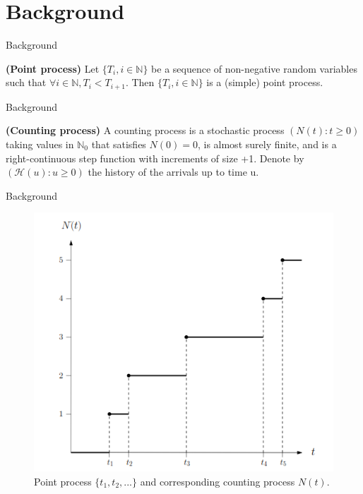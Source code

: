 \documentclass[11pt]{beamer}
\theoremstyle{example}
\begin{document}
\section{Background}
\begin{frame}{Background}
\begin{definition}
	\textbf{(Point process)} Let $\{T_i, i \in \mathbb{N} \}$ be a sequence of non-negative random variables such that $\forall i \in \mathbb{N}, T_i<T_{i+1}$. Then $\{T_i, i \in \mathbb{N} \}$ is a (simple) point process.
\end{definition}
\end{frame}
\begin{frame}{Background}
	\begin{definition}
		\textbf{(Counting process)} A counting process is a stochastic process $(N(t):t \geq 0)$ taking values in $\mathbb{N}_0$ that satisfies $N(0)=0$, is almost surely finite, and is a right-continuous step function with increments of size +1. Denote by $(\mathcal{H}(u): u \geq 0)$ the history of the arrivals up to time u.
	\end{definition}
\end{frame}
\begin{frame}{Background}
\begin{figure}[H]
	\centering
	\includegraphics[scale=.6]{coutingprocess}
	\caption[Point process $\{t_1, t_2,...\}$ and corresponding counting process $N(t)$.]{Point process $\{t_1, t_2,...\}$ and corresponding counting process $N(t)$.}
\end{figure}
\end{frame}
\end{document}
